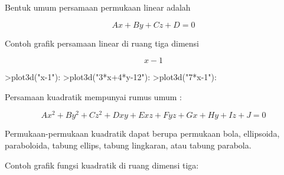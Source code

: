 \documentclass[a4paper,10pt]{article}
\begin{document}
\begin{eulernotebook}
\begin{eulercomment}
\begin{eulercomment}
\begin{eulercomment}
\begin{eulercomment}
\begin{eulercomment}
\begin{eulercomment}
\begin{eulercomment}
\begin{eulercomment}
\begin{eulercomment}
\begin{eulercomment}
\begin{eulercomment}
\begin{eulercomment}
\begin{eulercomment}
\begin{eulercomment}
\begin{eulercomment}
\begin{eulercomment}
\begin{eulercomment}
\begin{eulercomment}
\begin{eulercomment}
\begin{eulercomment}
\begin{eulercomment}
\begin{eulercomment}
\begin{eulercomment}
\begin{eulercomment}
\begin{eulercomment}
\begin{eulercomment}
\begin{eulercomment}
\begin{eulercomment}
\begin{eulercomment}
\end{eulercomment}
\begin{eulercomment}
Bentuk umum persamaan permukaan linear adalah\\
\end{eulercomment}
\begin{eulerformula}
\[
Ax+By+Cz+D=0
\]
\end{eulerformula}
\begin{eulercomment}
Contoh grafik persamaan linear di ruang tiga dimensi


\end{eulercomment}
\begin{eulerformula}
\[
x-1
\]
\end{eulerformula}
\begin{eulerprompt}
>plot3d("x-1"):
>plot3d("3*x+4*y-12"):
>plot3d("7*x-1"):
\end{eulerprompt}
\begin{eulercomment}
Persamaan kuadratik mempunyai rumus umum :\\
\end{eulercomment}
\begin{eulerformula}
\[
Ax^2+By^2+Cz^2+Dxy+Exz+Fyz+Gx+Hy+Iz+J=0
\]
\end{eulerformula}
\begin{eulercomment}
Permukaan-permukaan kuadratik dapat berupa permukaan bola, ellipsoida,
paraboloida, tabung ellips, tabung lingkaran, atau tabung parabola.

Contoh grafik fungsi kuadratik di ruang dimensi tiga:


\end{eulercomment}
\end{eulercomment}
\end{eulercomment}
\end{eulercomment}
\end{eulercomment}
\end{eulercomment}
\end{eulercomment}
\end{eulercomment}
\end{eulercomment}
\end{eulercomment}
\end{eulercomment}
\end{eulercomment}
\end{eulercomment}
\end{eulercomment}
\end{eulercomment}
\end{eulercomment}
\end{eulercomment}
\end{eulercomment}
\end{eulercomment}
\end{eulercomment}
\end{eulercomment}
\end{eulercomment}
\end{eulercomment}
\end{eulercomment}
\end{eulercomment}
\end{eulercomment}
\end{eulercomment}
\end{eulercomment}
\end{eulercomment}
\end{eulernotebook}
\end{document}
